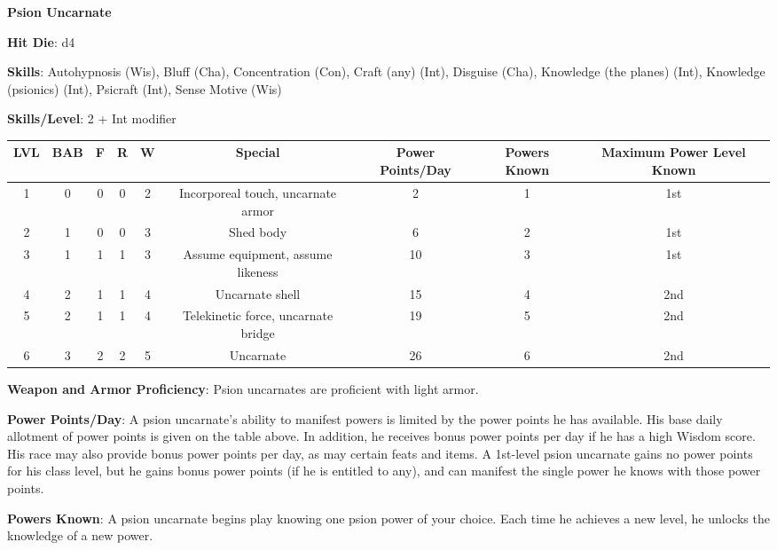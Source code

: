 \textbf{\huge{Psion Uncarnate}}

\textbf{Hit Die}: d4

\textbf{Skills}: Autohypnosis (Wis), Bluff (Cha), Concentration (Con), Craft (any) (Int), Disguise (Cha), Knowledge (the planes) (Int), Knowledge (psionics) (Int), Psicraft (Int), Sense Motive (Wis)

\textbf{Skills/Level}: 2 + Int modifier

\begin{center}
\begin{adjustwidth}{-4cm}{}
\begin{small}
\begin{tabular}{| c | c | c | c | c | c | c | c | c |}
\hline
LVL &BAB &F &R &W &Special &Power Points/Day &Powers Known &Maximum Power Level Known \\
\hline
1 &0 &0 &0 &2 &Incorporeal touch, uncarnate armor &2 &1 &1st \\
2 &1 &0 &0 &3 &Shed body &6 &2 &1st \\
3 &1 &1 &1 &3 &Assume equipment, assume likeness &10 &3 &1st \\
4 &2 &1 &1 &4 &Uncarnate shell &15 &4 &2nd \\
5 &2 &1 &1 &4 &Telekinetic force, uncarnate bridge &19 &5 &2nd \\
6 &3 &2 &2 &5 &Uncarnate &26 &6 &2nd \\
\hline
\end{tabular}
\end{small}
\end{adjustwidth}
\end{center}

\textbf{Weapon and Armor Proficiency}: Psion uncarnates are proficient with light armor.

\textbf{Power Points/Day}: A psion uncarnate's ability to manifest powers is limited by the power points he has available. His base daily allotment of power points is given on the table above. In addition, he receives bonus power points per day if he has a high Wisdom score. His race may also provide bonus power points per day, as may certain feats and items. A 1st-level psion uncarnate gains no power points for his class level, but he gains bonus power points (if he is entitled to any), and can manifest the single power he knows with those power points.

\textbf{Powers Known}: A psion uncarnate begins play knowing one psion power of your choice. Each time he achieves a new level, he unlocks the knowledge of a new power.

